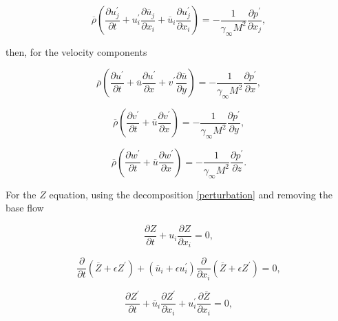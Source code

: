 \begin{equation*} 
\overline{\rho}
\left(
\frac{\partial u_j^{\prime}}{\partial t}
+
u_i^{\prime}
\frac{\partial\overline{u}_j}{\partial x_i}
+
\overline{u}_i
\frac{\partial u_j^{\prime}}{\partial x_i}
\right)
=
-
\frac{1}{\gamma_{\infty} M^{2}}
\frac{\partial p^{\prime} }{\partial x_j} 
,
\end{equation*} 

then, for the velocity components

\begin{equation} 
\overline{\rho}
\left(
\frac{\partial u^{\prime}}{\partial t}
+
\overline{u}
\frac{\partial u^{\prime}}{\partial x}
+
v^{\prime}
\frac{\partial\overline{u}}{\partial y}
\right)
=
-
\frac{1}{\gamma_{\infty} M^{2}}
\frac{\partial p^{\prime} }{\partial x} 
,
\end{equation} 

\begin{equation} 
\overline{\rho}
\left(
\frac{\partial v^{\prime}}{\partial t}
+
\overline{u}
\frac{\partial v^{\prime}}{\partial x}
\right)
=
-
\frac{1}{\gamma_{\infty} M^{2}}
\frac{\partial p^{\prime} }{\partial y} 
,
\end{equation} 

\begin{equation} 
\overline{\rho}
\left(
\frac{\partial w^{\prime}}{\partial t}
+
\overline{u}
\frac{\partial w^{\prime}}{\partial x}
\right)
=
-
\frac{1}{\gamma_{\infty} M^{2}}
\frac{\partial p^{\prime} }{\partial z} 
.
\end{equation} 

For the $Z$ equation, using the decomposition  \ref{perturbation} and 
removing the base flow

\begin{equation} 
\frac{\partial Z}{\partial t}
+
u_i 
\frac{\partial Z}{\partial x_i}
=
0
,
\end{equation} 

\begin{equation} 
\frac{\partial }{\partial t}
(\overline{Z}+\epsilon Z^{\prime})
+
(\overline{u}_i+\epsilon u_i^{\prime}) 
\frac{\partial }{\partial x_i}
(\overline{Z}+\epsilon Z^{\prime})
=
0
,
\end{equation} 

\begin{equation} 
\frac{\partial Z^{\prime}}{\partial t}
+
\overline{u}_i 
\frac{\partial  Z^{\prime}}{\partial x_i}
+
u_i^{\prime} 
\frac{\partial \overline{Z}}{\partial x_i}
=
0
,
\end{equation} 


